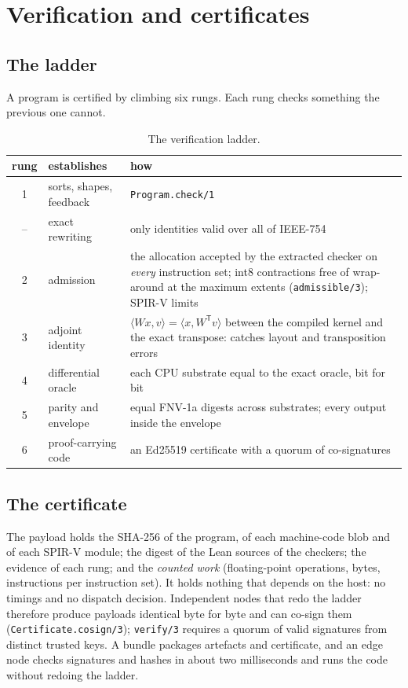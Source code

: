 \chapter{Verification and certificates}\label{ch:verification}

\section{The ladder}

A program is certified by climbing six rungs. Each rung checks something the previous one cannot.

\begin{table}[h]
\centering\small
\begin{tabularx}{\textwidth}{@{}clX@{}}
\toprule
rung & establishes & how \\
\midrule
1 & sorts, shapes, feedback & \texttt{Program.check/1} \\
-- & exact rewriting & only identities valid over all of IEEE-754 \\
2 & admission & the allocation accepted by the extracted checker on \emph{every} instruction set; int8 contractions free of wrap-around at the maximum extents (\texttt{admissible/3}); SPIR-V limits \\
3 & adjoint identity & $\langle Wx, v\rangle = \langle x, W^{\mathsf T}v\rangle$ between the compiled kernel and the exact transpose: catches layout and transposition errors \\
4 & differential oracle & each CPU substrate equal to the exact oracle, bit for bit \\
5 & parity and envelope & equal FNV-1a digests across substrates; every output inside the envelope \\
6 & proof-carrying code & an Ed25519 certificate with a quorum of co-signatures \\
\bottomrule
\end{tabularx}
\caption{The verification ladder.}
\end{table}

\section{The certificate}

The payload holds the SHA-256 of the program, of each machine-code blob and of each SPIR-V module; the
digest of the Lean sources of the checkers; the evidence of each rung; and the \emph{counted work}
(floating-point operations, bytes, instructions per instruction set). It holds nothing that depends on
the host: no timings and no dispatch decision. Independent nodes that redo the ladder therefore produce
payloads identical byte for byte and can co-sign them (\texttt{Certificate.cosign/3});
\texttt{verify/3} requires a quorum of valid signatures from distinct trusted keys. A bundle packages
artefacts and certificate, and an edge node checks signatures and hashes in about two milliseconds and
runs the code without redoing the ladder.

